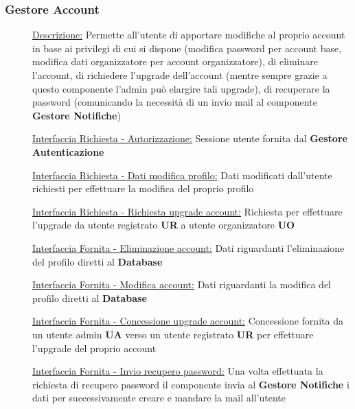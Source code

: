 \documentclass{article}
\begin{document}
\subsubsection{Gestore Account}
\begin{description}
    \item[] \underline{Descrizione:} Permette all'utente di apportare modifiche al proprio account in base ai privilegi di cui si dispone (modifica password per account base, modifica dati organizzatore per account organizzatore), di eliminare l'account, di richiedere l'upgrade dell'account (mentre sempre grazie a questo componente l'admin può elargire tali upgrade), di recuperare la password (comunicando la necessità di un invio mail al componente \textbf{Gestore Notifiche})
    \item[] \underline{Interfaccia Richiesta - Autorizzazione:} Sessione utente fornita dal \textbf{Gestore Autenticazione}
    \item[] \underline{Interfaccia Richiesta - Dati modifica profilo:} Dati modificati dall'utente richiesti per effettuare la modifica del proprio profilo
    \item[] \underline{Interfaccia Richiesta - Richiesta upgrade account:} Richiesta per effettuare l'upgrade da utente registrato \textbf{UR} a utente organizzatore \textbf{UO}
    \item[] \underline{Interfaccia Fornita - Eliminazione account:} Dati riguardanti l'eliminazione del profilo diretti al \textbf{Database}
    \item[] \underline{Interfaccia Fornita - Modifica account:} Dati riguardanti la modifica del profilo diretti al \textbf{Database}
    \item[] \underline{Interfaccia Fornita - Concessione upgrade account:} Concessione fornita da un utente admin \textbf{UA} verso un utente registrato \textbf{UR} per effettuare l'upgrade del proprio account
    \item[] \underline{Interfaccia Fornita - Invio recupero password:} Una volta effettuata la richiesta di recupero password il componente invia al \textbf{Gestore Notifiche} i dati per successivamente creare e mandare la mail all'utente
\end{description}
\end{document}
